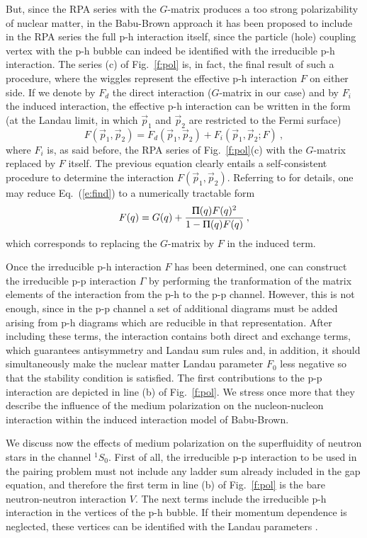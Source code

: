 \documentclass[runningheads]{svmult}
\newcommand{\greeksym}[1]{{\usefont{U}{psy}{m}{n}#1}}
\newcommand{\uPi}{\mbox{\greeksym{P}}}
\newcommand{\be}{\begin{equation}}
\newcommand{\ee}{\end{equation}}
\def\gam{\Gamma}
\def\ss{^1\!S_0}
\begin{document}
But, since the RPA series  
with the $G$-matrix produces a too strong polarizability of nuclear matter, 
in the Babu-Brown approach it has been proposed to include in the RPA series 
the full p-h interaction itself, since the particle (hole) coupling 
vertex with the p-h bubble can indeed be identified with the 
irreducible p-h interaction. 
The series (c) of Fig.~\ref{f:pol} is, in fact, the final result of such 
a procedure, where the wiggles represent the effective p-h interaction 
$F$ on either side.
If we denote by $F_d$ the direct interaction ($G$-matrix in our case) 
and by $F_i$ the induced interaction, the effective p-h interaction can be
written in the form (at the Landau limit, in which $\vec p_1$ and $\vec p_2$ 
are restricted to the Fermi surface) 
\be
 F(\vec p_1,\vec p_2) = 
 F_d(\vec p_1,\vec p_2) +  F_i(\vec p_1,\vec p_2;F)  \:,  
\label{e:find}
\ee
where $F_i$ is, as said before, the RPA series of Fig.~\ref{f:pol}(c) 
with the $G$-matrix replaced by $F$ itself. 
The previous equation clearly entails a self-consistent 
procedure to determine the interaction $F(\vec p_1,\vec p_2)$.  
Referring to \cite{SCHU} for details, one may reduce Eq.~(\ref{e:find}) to
a numerically tractable form 
\be
 F(q) = G(q) + \frac{\uPi(q) F(q)^2}{1 - \uPi(q) F(q)}  \:,
\label{e:wind}
\ee
which corresponds to replacing the $G$-matrix by $F$ in the induced term.   

Once the irreducible p-h interaction $F$ has been determined, 
one can construct the irreducible p-p interaction $\gam$  
by performing the tranformation of the matrix elements of the interaction
from the p-h to the p-p channel. 
However, this is not enough, since in the p-p channel
a set of additional diagrams must be added arising from p-h 
diagrams which are reducible in that representation.
After including these terms, the interaction contains both direct and exchange
terms, which guarantees antisymmetry and Landau sum rules and, in addition,
it should simultaneously make the nuclear matter Landau parameter ${F}_0$ less 
negative so that the stability condition is satisfied. 
The first contributions to the p-p interaction are depicted in 
line (b) of Fig.~\ref{f:pol}. 
We stress once more that they describe the 
influence of the medium polarization on the nucleon-nucleon interaction within 
the induced interaction model of Babu-Brown.

We discuss now the effects of medium polarization on the superfluidity of 
neutron stars in the channel $\ss$. 
First of all, the irreducible p-p interaction to be used in the 
pairing problem must not include any ladder sum already included in the gap 
equation, 
and therefore the first term in line (b) of Fig.~\ref{f:pol}
is the bare neutron-neutron interaction $V$. 
The next terms include the irreducible p-h interaction in the vertices 
of the p-h bubble. 
If their momentum dependence is neglected, these 
vertices can be identified with the Landau parameters \cite{BACK73}.  
\end{document}
